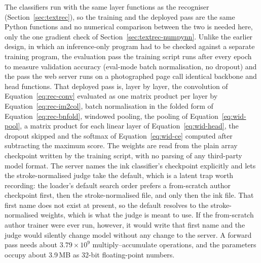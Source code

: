 The classifiers run with the same layer functions as the recogniser (Section~\ref{sec:textrec}), so the training and the deployed pass are the same Python functions and no numerical comparison between the two is needed here, only the one gradient check of Section~\ref{sec:textrec-numpynn}.
Unlike the earlier design, in which an inference-only program had to be checked against a separate training program, the evaluation pass the training script runs after every epoch to measure validation accuracy (eval-mode batch normalisation, no dropout) and the pass the web server runs on a photographed page call identical backbone and head functions.
That deployed pass is, layer by layer, the convolution of Equation~\ref{eq:rec-conv} evaluated as one matrix product per layer by Equation~\ref{eq:rec-im2col}, batch normalisation in the folded form of Equation~\ref{eq:rec-bnfold}, windowed pooling, the pooling of Equation~\ref{eq:wid-pool}, a matrix product for each linear layer of Equation~\ref{eq:wid-head}, the dropout skipped and the softmax of Equation~\ref{eq:wid-ce} computed after subtracting the maximum score.
The weights are read from the plain array checkpoint written by the training script, with no parsing of any third-party model format.
The server names the ink classifier's checkpoint explicitly and lets the stroke-normalised judge take the default, which is a latent trap worth recording: the loader's default search order prefers a from-scratch author checkpoint first, then the stroke-normalised file, and only then the ink file. That first name does not exist at present, so the default resolves to the stroke-normalised weights, which is what the judge is meant to use. If the from-scratch author trainer were ever run, however, it would write that first name and the judge would silently change model without any change to the server.
A forward pass needs about $3.79\times10^9$ multiply--accumulate operations, and the parameters occupy about 3.9\,MB as 32-bit floating-point numbers.
